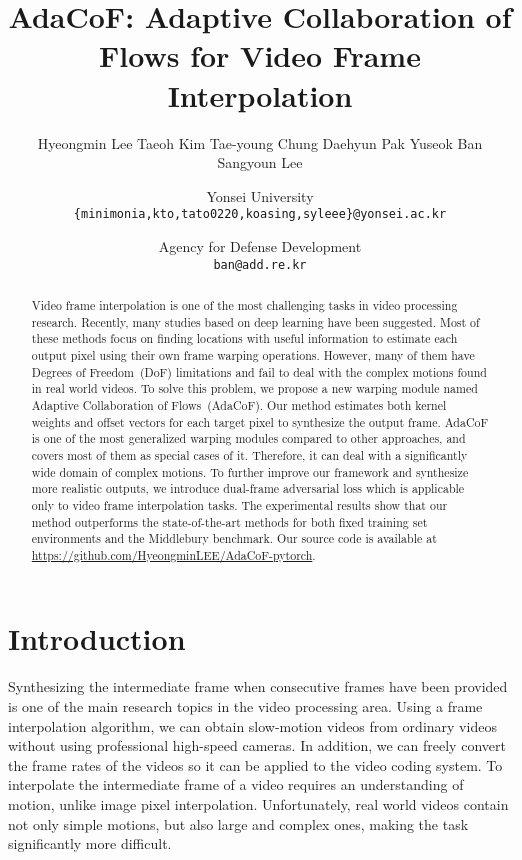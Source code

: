 \documentclass[10pt,twocolumn,letterpaper]{article}
\begin{document}
\title{AdaCoF: Adaptive Collaboration of Flows for Video Frame Interpolation}

\author{Hyeongmin Lee \quad
	Taeoh Kim \quad
	Tae-young Chung \quad
	Daehyun Pak \quad
	Yuseok Ban \quad
	Sangyoun Lee \\ \vspace{0.01cm}
	\and 
	Yonsei University \\
	{\tt\small \{minimonia,kto,tato0220,koasing,syleee\}@yonsei.ac.kr}
	\and
	Agency for Defense Development \\
	{\tt\small ban@add.re.kr}
}

\maketitle

\begin{abstract}
	Video frame interpolation is one of the most challenging tasks in video processing research. Recently, many studies based on deep learning have been suggested. Most of these methods focus on finding locations with useful information to estimate each output pixel using their own frame warping operations. However, many of them have Degrees of Freedom~(DoF) limitations and fail to deal with the complex motions found in real world videos. To solve this problem, we propose a new warping module named Adaptive Collaboration of Flows~(AdaCoF). Our method estimates both kernel weights and offset vectors for each target pixel to synthesize the output frame. AdaCoF is one of the most generalized warping modules compared to other approaches, and covers most of them as special cases of it. Therefore, it can deal with a significantly wide domain of complex motions. To further improve our framework and synthesize more realistic outputs, we introduce dual-frame adversarial loss which is applicable only to video frame interpolation tasks. The experimental results show that our method outperforms the state-of-the-art methods for both fixed training set environments and the Middlebury benchmark. Our source code is available at \url{https://github.com/HyeongminLEE/AdaCoF-pytorch}.
\end{abstract}

\section{Introduction}

Synthesizing the intermediate frame when consecutive frames have been provided is one of the main research topics in the video processing area. Using a frame interpolation algorithm, we can obtain slow-motion videos from ordinary videos without using professional high-speed cameras. In addition, we can freely convert the frame rates of the videos so it can be applied to the video coding system. To interpolate the intermediate frame of a video requires an understanding of motion, unlike image pixel interpolation. Unfortunately, real world videos contain not only simple motions, but also large and complex ones, making the task significantly more difficult.
\end{document}
